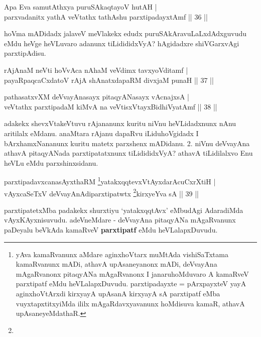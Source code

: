 
\begin{shl}
Apa Eva samutAthxya puruSAkaqtayoV hutAH | \\
parxvadanitx yathA veVtathx tathA\s \s shu parxtipadayxtAmf \hfill|| 36 || 
\end{shl}

\begin{artha}
hoVma mADidadx jalaveV meVlakekx edudx puruSAkAravuLaLxdAdxguvudu eMdu heVge heVLuvaro adanunx tiLidididxVyA? hAgidadxre shiVGarxvAgi parxtipAdisu.
\end{artha}

\begin{shl}
rAjAnaM neVti hoVvAca nAhaM veVdimx tavxyoVditamf | \\
payaRpaqcaCxdatoV rAjA shAnatxdapaRM divxjaM punaH \hfill|| 37 || 
\end{shl}

\begin{shl}
pathasatxvXM deVvayAnasayx pitaqyANasayx vA\s cnajxsA | \\
veVtathx parxtipadaM kiMvA na veVtisxVtayxBidhiVyatAmf \hfill|| 38 || 
\end{shl}

\begin{artha}
adakekx shevxVtakeVtuvu rAjananunx kuritu niVnu heVLidadxnunx nAnu 
aritilalx eMdanu. anaMtara rAjanu dapaRvu iLiduhoVgidadx I 
bArxhamxNananunx kuritu matetx parxshenx mADidanu. 2. niVnu deVvayAna 
athavA pitaqyANada parxtipatatxnunx tiLidididxVyA? athavA tiLidilalxvo 
Enu heVLu eMdu parxshinxsidanu.
\end{artha}



\begin{shl}
parxtipadavxcanasAyxthaRM \footnote{yAva kamaRvanunx aMdare aginxhoVtarx muMtAda  vishiSaTxtama kamaRvanunx mADi, athavA upAsaneyanonx mADi, deVvayAna  mAgaRvanonx pitaqyANa mAgaRvanonx I janaru\break hoMduvaro A kamaRveV  parxtipatf eMdu heVLalapxDuvudu. parxtipadayxte = pArxpayxteV yayA  aginxhoVtArxdi kirxyayA upAsanA kirxyayA sA parxtipatf eMba  vuyxtapxtitxyiMda ililx mAgaRdavxyavanunx hoMdisuva kamaR, athavA  upAsaneyeMdathaR.}yatakxqqtevxVtAyxdarAcuCxrXtiH | \\
vAyxcaSeTxV deVvayAnAdiparxtipatwtx \footnote{}kirxyeYva sA \hfill|| 39 || 
\end{shl}


\begin{artha}
parxtipatetxMba padakekx shurxtiyu `yatakxqqtAvx' eMbudAgi AdaradiMda 
vAyxKAyxnisuvudu. adeVneMdare - deVvayAna pitaqyANa mAgaRvanunx 
paDeyalu beVkAda kamaRveV \textbf{parxtipatf} eMdu heVLalapxDuvudu.
\end{artha}

